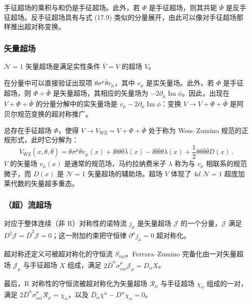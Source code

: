 手征超场的乘积与和仍是手征超场。此外，若 $\Phi$ 是手征超场，则其共轭 $\bar\Phi$ 是反手征超场。反手征超场具有与式 (17.9) 类似的分量展开，由此可以像对手征超场那样推出超对称变换。

\subsubsection*{矢量超场}

\begin{definition}[17.18] $\mathcal{N}=1$ 矢量超场是满足实性条件 $\bar V=V$ 的超场 $V$。\end{definition}

在分量中可以直接验证出现项 $\theta\sigma^\mu\bar\theta v_\mu$，其中 $v_\mu$ 是实矢量场。此外，若 $\Phi$ 是手征超场，则 $\Phi+\bar\Phi$ 是矢量超场，其相应的矢量场为 $-2\partial_\mu\operatorname{Im}\phi$。因此，出现在 $V+\Phi+\bar\Phi$ 的分量分解中的实矢量场是 $v_\mu-2\partial_\mu\operatorname{Im}\phi$：变换 $V\to V+\Phi+\bar\Phi$ 是阿贝尔规范变换的超对称推广。

\begin{remark}[17.19] 总存在手征超场 $\Phi$，使得 $V\to V_{\mathrm{WZ}}=V+\Phi+\bar\Phi$ 处于称为 Wess–Zumino 规范的正规形式，此时它分解为：
\[
V_{\mathrm{WZ}}(x,\theta,\bar\theta)=\theta\sigma^\mu\bar\theta v_\mu(x)+\ii\theta\theta\bar\theta\bar\lambda(x)-\ii\bar\theta\bar\theta\theta\lambda(x)+\frac{1}{2}\theta\theta\bar\theta\bar\theta D(x)\,.
\]
$V$ 的矢量场 $v_\mu(x)$ 是通常的规范场，马约拉纳费米子 $\lambda$ 称为与 $v_\mu$ 相联系的规范微子，而 $D(x)$ 是 $\mathcal{N}=1$ 矢量超场的辅助场。超场 $V$ 体现了 $4d$ $\mathcal{N}=1$ 超庞加莱代数的矢量超多重态。\end{remark}

\subsubsection*{（超）流超场}

对应于整体连续（非 R）对称性的诺特流 $j_\mu$ 是矢量超场 $\mathcal{J}$ 的一个分量，$\mathcal{J}$ 满足 $D^2\mathcal{J}=\bar D^2\mathcal{J}=0$；这一附加约束把守恒律 $\partial^\mu j_\mu=0$ 超对称化。

超对称还定义可被超对称化的守恒流 $S_{\alpha\mu}$。Ferrara–Zumino 完备化由一对矢量超场 $\mathcal{J}_\mu$ 与手征超场 $X$ 组成，满足 $2\bar D^{\dot\alpha}\sigma^\mu_{\alpha\dot\alpha}\mathcal{J}_\mu=D_\alpha X$。

最后，R 对称性的守恒流被超对称化为矢量超场 $\mathcal{R}_\mu$ 与手征超场 $\chi_\alpha$ 组成的一对，满足 $2\bar D^{\dot\alpha}\sigma^\mu_{\alpha\dot\alpha}\mathcal{R}_\mu=\chi_\alpha$，以及 $\bar D_{\dot\alpha}\bar\chi^{\dot\alpha}-D^\alpha\chi_\alpha=0$。

